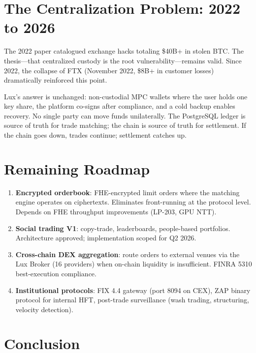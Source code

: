 \documentclass[11pt,a4paper]{article}
\begin{document}
\section{The Centralization Problem: 2022 to 2026}

The 2022 paper catalogued exchange hacks totaling \$40B+ in
stolen BTC. The thesis---that centralized custody is the root
vulnerability---remains valid. Since 2022, the collapse of FTX
(November 2022, \$8B+ in customer losses) dramatically reinforced
this point.

Lux's answer is unchanged: non-custodial MPC wallets where the
user holds one key share, the platform co-signs after compliance,
and a cold backup enables recovery. No single party can move funds
unilaterally. The PostgreSQL ledger is source of truth for trade
matching; the chain is source of truth for settlement. If the chain
goes down, trades continue; settlement catches up.

\section{Remaining Roadmap}

\begin{enumerate}[nosep]
  \item \textbf{Encrypted orderbook}: FHE-encrypted limit orders
        where the matching engine operates on ciphertexts. Eliminates
        front-running at the protocol level. Depends on FHE throughput
        improvements (LP-203, GPU NTT).
  \item \textbf{Social trading V1}: copy-trade, leaderboards,
        people-based portfolios. Architecture approved; implementation
        scoped for Q2 2026.
  \item \textbf{Cross-chain DEX aggregation}: route orders to external
        venues via the Lux Broker (16 providers) when on-chain
        liquidity is insufficient. FINRA 5310 best-execution
        compliance.
  \item \textbf{Institutional protocols}: FIX 4.4 gateway (port 8094
        on CEX), ZAP binary protocol for internal HFT, post-trade
        surveillance (wash trading, structuring, velocity detection).
\end{enumerate}

\section{Conclusion}
\end{document}
